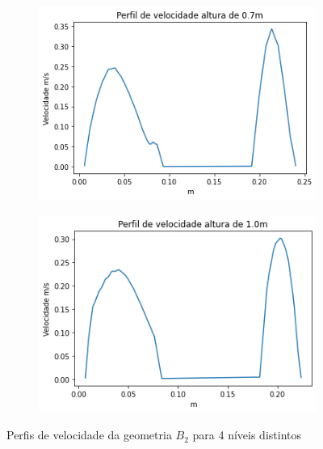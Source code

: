 \begin{figure}[H]
    	\begin{subfigure}[b]{0.42\linewidth}
    		\includegraphics[width=\linewidth]{img/perfil_vel/rugoso/perfil_velocidade_rugoso_s_700.png}
    	\end{subfigure}
    	\begin{subfigure}[b]{0.42\linewidth}
    		\includegraphics[width=\linewidth]{img/perfil_vel/rugoso/perfil_velocidade_rugoso_s_1000.png}
    	\end{subfigure}
    	\caption{Perfis de velocidade da geometria $B_2$ para 4 níveis distintos}
    	\label{fig:perfil_velocidade_rugosa_standoff}
    \end{figure}
    
